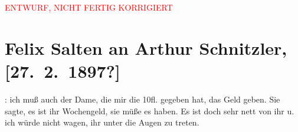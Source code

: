 
\begin{center}
            \textcolor{red}{ENTWURF, NICHT FERTIG KORRIGIERT}
                      \end{center}
            
         
         \renewcommand{\erwaehntePersonen}{Personen:  ?? [Frau, die Salten Geld leiht]}
         \renewcommand{\erwaehnteOrte}{Orte: Wien}
         \renewcommand{\erwaehnteWerke}{}
               \section[Felix Salten an Arthur Schnitzler, {[}27. 2. 1897?{]}]{ Felix Salten an Arthur Schnitzler, {[}27. 2. 1897?{]}}\nopagebreak{}\rehead{ }\begin{ledgroupsized}[t]{13cm}\normalsize\beginnumbering \toendnotes[C]{\smallbreak\pagebreak[2]} 
\toendnotes[C]{\smallbreak}\pstart
           \noindent{}{\pb}\label{K_L03359-1v}\label{K_L03359-1h}: ich muß auch der Dame, die mir die 10fl. gegeben hat, das Geld geben. Sie
               sagte, es ist ihr Wochengeld, sie müße es haben. Es ist doch sehr nett von ihr u. ich
               würde nicht wagen, ihr unter die Augen zu treten. \pend
           
         
         \endnumbering{}\end{ledgroupsized}\begin{anhang}\end{anhang}\newcommand{\dateiname}{L03359}\newcommand{\titel}{Felix Salten an Arthur Schnitzler, [27. 2. 1897?]}\newcommand{\editorInnen}{Martin Anton Müller und Laura Untner}
      
